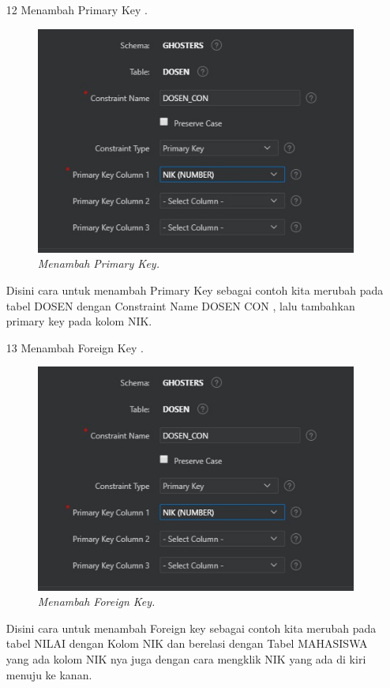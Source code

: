 \begin{enumerate}
\item[12]Menambah Primary Key .
\begin{figure}[!htbp]
    \begin{center}
    \includegraphics[scale=0.7]{figures/constrainst_column_Pkey.jpg}
    \caption{\textit{Menambah Primary Key.}}
    \end{center}
\end{figure}
\par Disini cara untuk menambah Primary Key sebagai contoh kita merubah pada tabel DOSEN dengan Constraint Name DOSEN CON , lalu tambahkan primary key pada kolom NIK.


\item[13]Menambah Foreign Key .
\begin{figure}[!htbp]
    \begin{center}
    \includegraphics[scale=0.7]{figures/constrainst_column_Pkey.jpg}
    \caption{\textit{Menambah Foreign Key.}}
    \end{center}
\end{figure}
\par Disini cara untuk menambah Foreign key sebagai contoh kita merubah pada tabel NILAI dengan Kolom NIK dan berelasi dengan Tabel MAHASISWA yang ada kolom NIK nya juga dengan cara mengklik NIK yang ada di kiri menuju ke kanan.



\end{enumerate}
